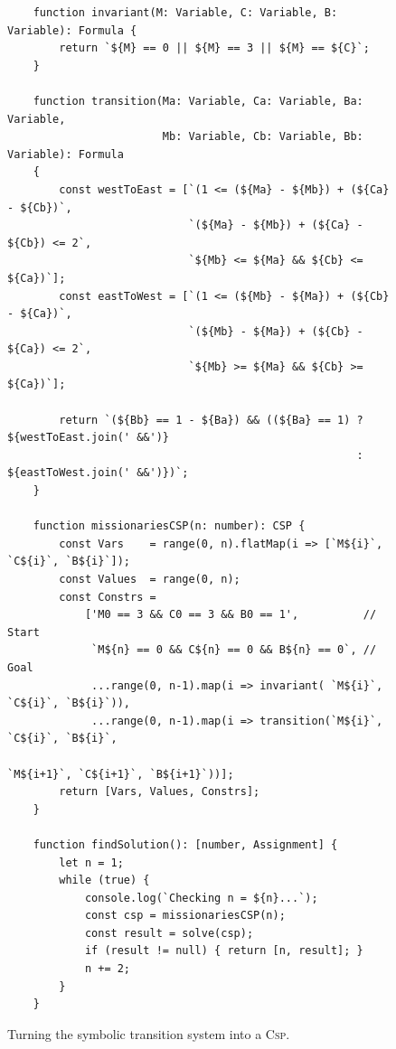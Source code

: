 \begin{figure}[!ht]
\centering
\begin{verbatim}
    function invariant(M: Variable, C: Variable, B: Variable): Formula {
        return `${M} == 0 || ${M} == 3 || ${M} == ${C}`;
    }
      
    function transition(Ma: Variable, Ca: Variable, Ba: Variable, 
                        Mb: Variable, Cb: Variable, Bb: Variable): Formula 
    {
        const westToEast = [`(1 <= (${Ma} - ${Mb}) + (${Ca} - ${Cb})`,
                            `(${Ma} - ${Mb}) + (${Ca} - ${Cb}) <= 2`,
                            `${Mb} <= ${Ma} && ${Cb} <= ${Ca})`];
        const eastToWest = [`(1 <= (${Mb} - ${Ma}) + (${Cb} - ${Ca})`, 
                            `(${Mb} - ${Ma}) + (${Cb} - ${Ca}) <= 2`, 
                            `${Mb} >= ${Ma} && ${Cb} >= ${Ca})`];
        
        return `(${Bb} == 1 - ${Ba}) && ((${Ba} == 1) ? ${westToEast.join(' &&')} 
                                                      : ${eastToWest.join(' &&')})`;
    }             

    function missionariesCSP(n: number): CSP {
        const Vars    = range(0, n).flatMap(i => [`M${i}`, `C${i}`, `B${i}`]);
        const Values  = range(0, n);
        const Constrs =
            ['M0 == 3 && C0 == 3 && B0 == 1',          // Start
             `M${n} == 0 && C${n} == 0 && B${n} == 0`, // Goal
             ...range(0, n-1).map(i => invariant( `M${i}`, `C${i}`, `B${i}`)),
             ...range(0, n-1).map(i => transition(`M${i}`, `C${i}`, `B${i}`, 
                                                  `M${i+1}`, `C${i+1}`, `B${i+1}`))];
        return [Vars, Values, Constrs];
    }

    function findSolution(): [number, Assignment] {
        let n = 1;
        while (true) {
            console.log(`Checking n = ${n}...`);
            const csp = missionariesCSP(n);
            const result = solve(csp);
            if (result != null) { return [n, result]; }
            n += 2;
        }
    }        
\end{verbatim}
\vspace*{-0.3cm}
\caption{Turning the symbolic transition system into a \textsc{Csp}.}
\label{fig:Missionaries-STS.ipynb}
\end{figure} %

